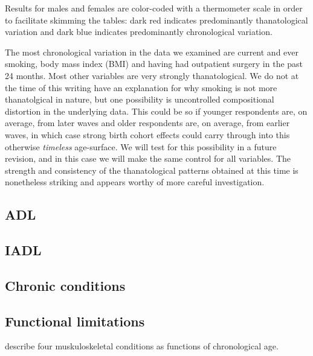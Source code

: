 \documentclass{article}
\begin{document}
Results for males and females are color-coded with a thermometer scale in order
to facilitate skimming the tables: dark red indicates
predominantly thanatological variation and dark blue indicates
predominantly chronological variation.

The most chronological variation in the data we examined are current and ever
smoking, body mass index (BMI) and having had outpatient surgery in the past 24
months. Most other variables are very strongly thanatological. We do not at the
time of this writing have an explanation for why smoking is not more
thanatolgical in nature, but one possibility is uncontrolled compositional
distortion in the underlying data. This could be so if younger respondents are,
on average, from later waves and older respondents are, on average, from earlier
waves, in which case strong birth cohort effects could carry through into this
otherwise \textit{timeless} age-surface. We will test for this possibility in a future
revision, and in this case we will make the same control for all variables. The
strength and consistency of the thanatological patterns obtained at this time is
nonetheless striking and appears worthy of more careful
investigation.

\FloatBarrier
\pagebreak
\subsection{ADL}



\FloatBarrier
\subsection{IADL}

\FloatBarrier

\pagebreak
\subsection{Chronic conditions}


\FloatBarrier

\subsection{Functional limitations}


\citet{woolf2003burden} describe four muskuloskeletal conditions as functions of
chronological age.

\FloatBarrier
\end{document}
